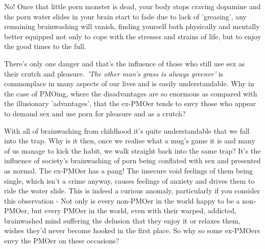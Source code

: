 \documentclass[easypeasy.tex]{subfiles}
\begin{document}
No! Once that little porn monster is dead, your body stops craving dopamine and the porn water slides in your brain start to fade due to lack of 'greasing', any remaining brainwashing will vanish, finding yourself both physically and mentally better equipped not only to cope with the stresses and strains of life, but to enjoy the good times to the full.

There's only one danger and that's the influence of those who still use sex as their crutch and pleasure. \textit{'The other man's grass is always greener'} is commonplace in many aspects of our lives and is easily understandable. Why in the case of PMOing, where the disadvantages are so enormous as compared with the illusionary 'advantages', that the ex-PMOer tends to envy those who appear to demand sex and use porn for pleasure and as a crutch?

With all of brainwashing from childhood it's quite understandable that we fall into the trap. Why is it then, once we realise what a mug's game it is and many of us manage to kick the habit, we walk straight back into the same trap? It's the influence of society's brainwashing of porn being conflated with sex and presented as normal. The ex-PMOer has a pang! The insecure void feelings of them being single, which isn't a crime anyway, causes feelings of anxiety and drives them to ride the water slide. This is indeed a curious anomaly, particularly if you consider this observation - Not only is every non-PMOer in the world happy to be a non-PMOer, but every PMOer in the world, even with their warped, addicted, brainwashed mind suffering the delusion that they enjoy it or relaxes them, wishes they'd never become hooked in the first place. So why so some ex-PMOers envy the PMOer on these occasions?
\end{document}
